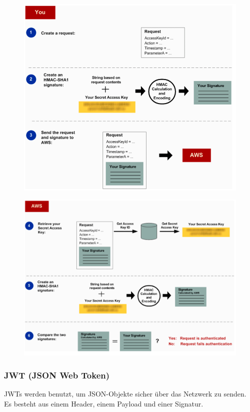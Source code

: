\documentclass[a4paper, 11pt]{article}
\begin{document}
\begin{figure}[htb]
	\centering
	\includegraphics[keepaspectratio=true,height=19.2\baselineskip]{aws_security_1.PNG}
\end{figure}
\begin{figure}[htb]
	\centering
	\includegraphics[keepaspectratio=true,height=19.2\baselineskip]{aws_security_2.PNG}
\end{figure}

\newpage

\subsubsection{JWT (JSON Web Token)}
JWTs werden benutzt, um JSON-Objekte sicher über das Netzwerk zu senden. Es besteht aus einem Header, einem Payload und einer Signatur.
\end{document}
